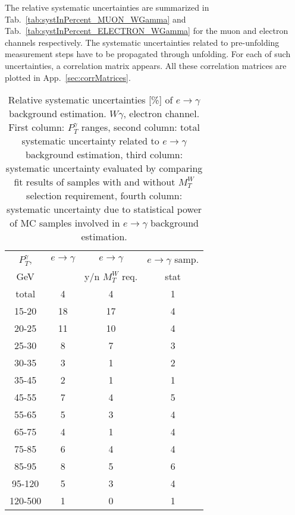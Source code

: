 The relative systematic uncertainties are summarized in Tab.~\ref{tab:systInPercent_MUON_WGamma} and Tab.~\ref{tab:systInPercent_ELECTRON_WGamma} for the muon and electron channels respectively. The systematic uncertainties related to pre-unfolding measurement steps have to be propagated through unfolding. For each of such uncertainties, a correlation matrix appears. All these correlation matrices are plotted in App.~\ref{sec:corrMatrices}.

\begin{table}[h]
  \scriptsize
  \begin{center}
  \caption{Relative systematic uncertainties [\%] of $e\rightarrow\gamma$ background estimation. $W\gamma$, electron channel. First column: $P_T^{\gamma}$ ranges, second column: total systematic uncertainty related to $e\rightarrow\gamma$ background estimation, third column: systematic uncertainty evaluated by comparing fit results of samples with and without $M_T^W$ selection requirement, fourth column: systematic uncertainty due to statistical power of MC samples involved in $e\rightarrow\gamma$ background estimation. }
  \begin{tabular}{|c|c|c|c|}
    $P_T^{\gamma}$,  & $e\rightarrow\gamma$ & $e\rightarrow\gamma$  & $e\rightarrow\gamma$ samp.\\
    GeV  &  & y/n $M_T^W$ req. & stat\\ \hline
    total  & 4 & 4 & 1 \\ \hline
    15-20 & 18 & 17 & 4 \\ \hline
    20-25 & 11 & 10 & 4 \\ \hline
    25-30 & 8 & 7 & 3 \\ \hline
    30-35 & 3 & 1 & 2 \\ \hline
    35-45 & 2 & 1 & 1 \\ \hline
    45-55 & 7 & 4 & 5 \\ \hline
    55-65 & 5 & 3 & 4 \\ \hline
    65-75 & 4 & 1 & 4 \\ \hline
    75-85 & 6 & 4 & 4 \\ \hline
    85-95 & 8 & 5 & 6 \\ \hline
    95-120 & 5 & 3 & 4 \\ \hline
    120-500 & 1 & 0 & 1 \\ \hline
  \end{tabular}
  \label{tab:systInPercentEtogamma_ELECTRON_WGamma}
  \end{center}
\end{table}

